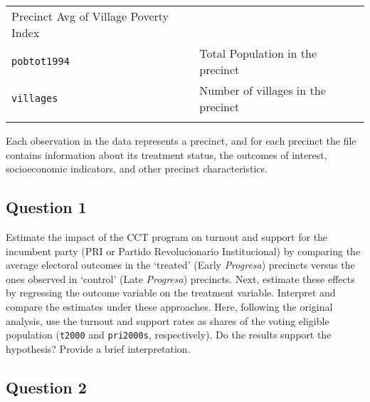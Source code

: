 \documentclass[]{article}
\begin{document}
\begin{longtable}[c]{@{}ll@{}}
\begin{minipage}[t]{0.68\columnwidth}
Precinct Avg of Village Poverty Index
\end{minipage}
\\\addlinespace
\begin{minipage}[t]{0.25\columnwidth}\raggedright
\texttt{pobtot1994}
\end{minipage} & \begin{minipage}[t]{0.68\columnwidth}\raggedright
Total Population in the precinct
\end{minipage}
\\\addlinespace
\begin{minipage}[t]{0.25\columnwidth}\raggedright
\texttt{villages}
\end{minipage} & \begin{minipage}[t]{0.68\columnwidth}\raggedright
Number of villages in the precinct
\end{minipage}
\\\addlinespace
\bottomrule
\end{longtable}

Each observation in the data represents a precinct, and for each
precinct the file contains information about its treatment status, the
outcomes of interest, socioeconomic indicators, and other precinct
characteristics.

\subsection{Question 1}\label{question-1}

Estimate the impact of the CCT program on turnout and support for the
incumbent party (PRI or Partido Revolucionario Institucional) by
comparing the average electoral outcomes in the `treated' (Early
\emph{Progresa}) precincts versus the ones observed in `control' (Late
\emph{Progresa}) precincts. Next, estimate these effects by regressing
the outcome variable on the treatment variable. Interpret and compare
the estimates under these approaches. Here, following the original
analysis, use the turnout and support rates as shares of the voting
eligible population (\texttt{t2000} and \texttt{pri2000s},
respectively). Do the results support the hypothesis? Provide a brief
interpretation.

\subsection{Question 2}\label{question-2}
\end{document}
